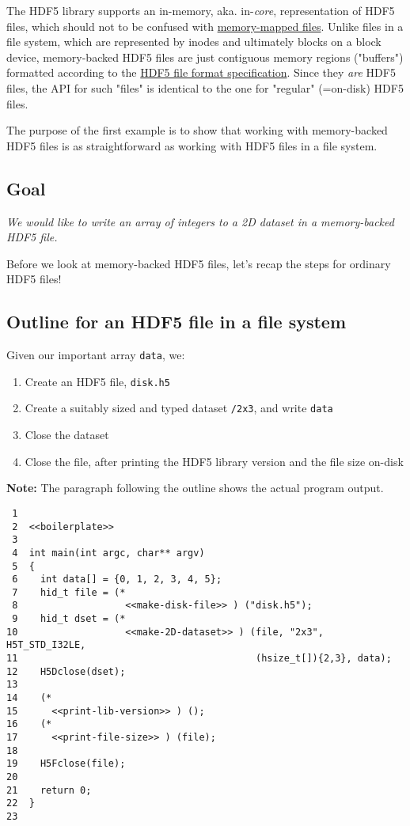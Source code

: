\documentclass[a4paper, 12pt]{article}
\begin{document}
The HDF5 library supports an in-memory, aka. in-\emph{core}, representation of HDF5
files, which should not to be confused with \href{https://en.wikipedia.org/wiki/Memory-mapped\_file}{memory-mapped files}. Unlike files
in a file system, which are represented by inodes and ultimately blocks on a
block device, memory-backed HDF5 files are just contiguous memory regions
("buffers") formatted according to the \href{https://portal.hdfgroup.org/display/HDF5/File+Format+Specification}{HDF5 file format specification}. Since
they \emph{are} HDF5 files, the API for such "files" is identical to the one for
"regular" (=on-disk) HDF5 files.

The purpose of the first example is to show that working with memory-backed
HDF5 files is as straightforward as working with HDF5 files in a file system.

\subsection{Goal}
\label{sec:org2d56df6}

\emph{We would like to write an array of integers to a 2D dataset in a
memory-backed HDF5 file.}

Before we look at memory-backed HDF5 files, let's recap the steps for
ordinary HDF5 files!

\subsection{Outline for an HDF5 file in a file system}
\label{sec:org92fff9f}

Given our important array \texttt{data}, we:
\begin{enumerate}
\item Create an HDF5 file, \texttt{disk.h5}
\item Create a suitably sized and typed dataset \texttt{/2x3}, and write \texttt{data}
\item Close the dataset
\item Close the file, after printing the HDF5 library version and the file size
on-disk
\end{enumerate}

\textbf{\textbf{Note:}} The paragraph following the outline shows the actual program
output.

\begin{verbatim}
 1
 2  <<boilerplate>>
 3
 4  int main(int argc, char** argv)
 5  {
 6    int data[] = {0, 1, 2, 3, 4, 5};
 7    hid_t file = (*
 8                   <<make-disk-file>> ) ("disk.h5");
 9    hid_t dset = (*
10                   <<make-2D-dataset>> ) (file, "2x3", H5T_STD_I32LE,
11                                          (hsize_t[]){2,3}, data);
12    H5Dclose(dset);
13
14    (*
15      <<print-lib-version>> ) ();
16    (*
17      <<print-file-size>> ) (file);
18
19    H5Fclose(file);
20
21    return 0;
22  }
23
\end{verbatim}
\end{document}
